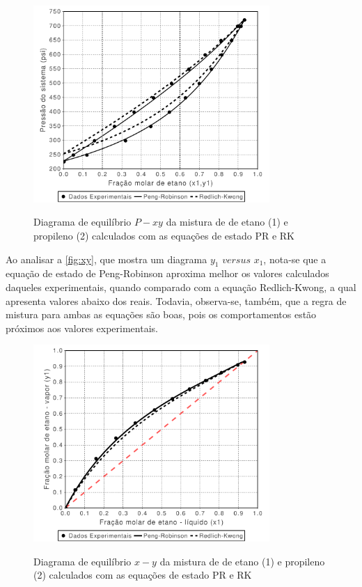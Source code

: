 \begin{figure}[htb]
\centering
{\includegraphics[width=0.8\textwidth]{img/trab2_pxy.pdf}} 
\caption{Diagrama de equilíbrio $P-xy$ da mistura de de etano (1) e
propileno (2) calculados com as equações de estado PR e RK}
\label{fig:pxy}
\end{figure} 

Ao analisar a \autoref{fig:xy}, que mostra um diagrama $y_1$ $versus$  $x_1$,
nota-se que a equação de estado de Peng-Robinson aproxima melhor os valores
calculados daqueles experimentais, quando comparado com a equação
Redlich-Kwong, a qual apresenta valores abaixo dos reais. Todavia, observa-se,
também, que a regra de mistura para ambas as equações são boas, pois os
comportamentos estão próximos aos valores experimentais.

\clearpage

\begin{figure}[htb]
\centering
{\includegraphics[width=0.8\textwidth]{img/trab2_xy.pdf}}
\caption{Diagrama de equilíbrio $x-y$ da mistura de de etano (1) e
propileno (2) calculados com as equações de estado PR e RK} 
\label{fig:xy}
\end{figure} 


